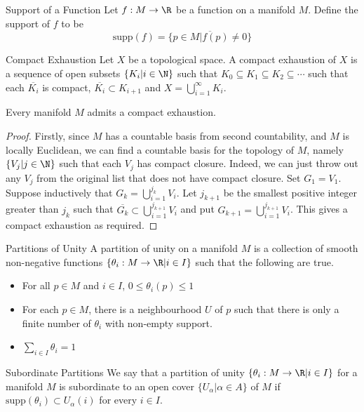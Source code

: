 \documentclass[a4paper]{article}
\begin{document}
\begin{defn}{Support of a Function}{} Let $f:M\to\R$ be a function on a manifold $M$. Define the support of $f$ to be $$\text{supp}(f)=\overline{\{p\in M|f(p)\neq 0\}}$$
\end{defn}

\begin{defn}{Compact Exhaustion}{} Let $X$ be a topological space. A compact exhaustion of $X$ is a sequence of open subsets $\{K_i|i\in\N\}$ such that $K_0\subseteq K_1\subseteq K_2\subseteq\cdots$ such that each $\overline{K_i}$ is compact, $\overline{K_i}\subset K_{i+1}$ and $X=\bigcup_{i=1}^\infty K_i$. 
\end{defn}

\begin{prp}{}{} Every manifold $M$ admits a compact exhaustion. \tcbline
\begin{proof}
Firstly, since $M$ has a countable basis from second countability, and $M$ is locally Euclidean, we can find a countable basis for the topology of $M$, namely $\{V_j|j\in\N\}$ such that each $V_j$ has compact closure. Indeed, we can just throw out any $V_j$ from the original list that does not have compact closure. Set $G_1=V_1$. Suppose inductively that $G_k=\bigcup_{i=1}^{j_k}V_i$. Let $j_{k+1}$ be the smallest positive integer greater than $j_k$ such that $\overline{G_k}\subset\bigcup_{i=1}^{j_{k+1}}V_i$ and put $G_{k+1}=\bigcup_{i=1}^{j_{k+1}}V_i$. This gives a compact exhaustion as required. 
\end{proof}
\end{prp}

\begin{defn}{Partitions of Unity}{} A partition of unity on a manifold $M$ is a collection of smooth non-negative functions $\{\theta_i:M\to\R|i\in I\}$ such that the following are true. 
\begin{itemize}
\item For all $p\in M$ and $i\in I$, $0\leq\theta_i(p)\leq 1$
\item For each $p\in M$, there is a neighbourhood $U$ of $p$ such that there is only a finite number of $\theta_i$ with non-empty support. 
\item $\sum_{i\in I}\theta_i=1$
\end{itemize}
\end{defn}

\begin{defn}{Subordinate Partitions}{} We say that a partition of unity $\{\theta_i:M\to\R|i\in I\}$ for a manifold $M$ is subordinate to an open cover $\{U_\alpha|\alpha\in A\}$ of $M$ if $\text{supp}(\theta_i)\subset U_\alpha(i)$ for every $i\in I$. 
\end{defn}
\end{document}
